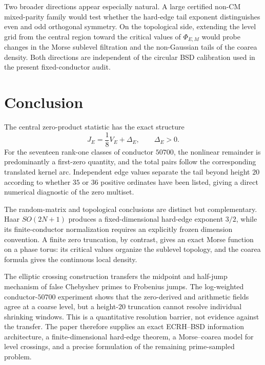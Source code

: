 \documentclass[11pt,reqno]{amsart}
\theoremstyle{remark}
\begin{document}
Two broader directions appear especially natural.  A large certified non-CM mixed-parity family would test whether the hard-edge tail exponent distinguishes even and odd orthogonal symmetry.  On the topological side, extending the level grid from the central region toward the critical values of $\Phi_{E,M}$ would probe changes in the Morse sublevel filtration and the non-Gaussian tails of the coarea density.  Both directions are independent of the circular BSD calibration used in the present fixed-conductor audit.

\section{Conclusion}

The central zero-product statistic has the exact structure
\[
  J_E=\frac18V_E+\Delta_E,
  \qquad \Delta_E>0.
\]
For the seventeen rank-one classes of conductor $50700$, the nonlinear remainder is predominantly a first-zero quantity, and the total pairs follow the corresponding translated kernel arc.  Independent edge values separate the tail beyond height $20$ according to whether $35$ or $36$ positive ordinates have been listed, giving a direct numerical diagnostic of the zero multiset.

The random-matrix and topological conclusions are distinct but complementary.  Haar $SO(2N+1)$ produces a fixed-dimensional hard-edge exponent $3/2$, while its finite-conductor normalization requires an explicitly frozen dimension convention.  A finite zero truncation, by contrast, gives an exact Morse function on a phase torus: its critical values organize the sublevel topology, and the coarea formula gives the continuous local density.

The elliptic crossing construction transfers the midpoint and half-jump mechanism of false Chebyshev primes to Frobenius jumps.  The log-weighted conductor-$50700$ experiment shows that the zero-derived and arithmetic fields agree at a coarse level, but a height-$20$ truncation cannot resolve individual shrinking windows.  This is a quantitative resolution barrier, not evidence against the transfer.  The paper therefore supplies an exact ECRH--BSD information architecture, a finite-dimensional hard-edge theorem, a Morse--coarea model for level crossings, and a precise formulation of the remaining prime-sampled problem.
\end{document}

